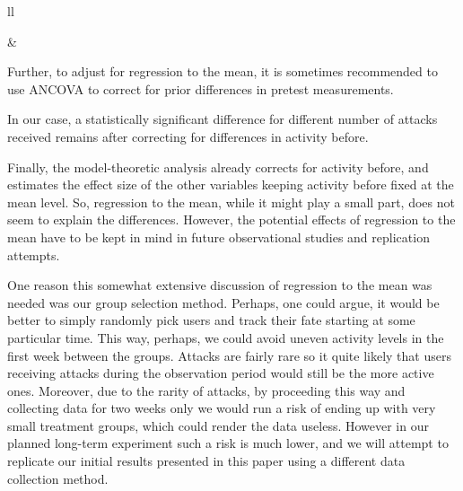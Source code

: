 \documentclass[10pt,dvipsnames]{scrartcl}
\begin{document}
\noindent 

\begin{tabular}{ll}
\begin{minipage}[c]{0.61\linewidth}

\begin{table}[H]
\footnotesize
{}
\normalsize 
\caption{Results of ANCOVA test of activity difference vs. activity before and the number of narrow attacks received.}
\end{table}
\end{minipage} & \begin{minipage}[c]{0.32\linewidth}
Further, to adjust for regression to the mean, it is sometimes recommended to  use ANCOVA to correct for prior differences in pretest measurements. 
\end{minipage}
\end{tabular}

\noindent In our case, a statistically significant difference for
different number of attacks received remains after correcting for
differences in activity before.

Finally, the model-theoretic analysis already corrects for activity
before, and estimates the effect size of the other variables keeping
activity before fixed at the mean level. So, regression to the mean,
while it might play a small part, does not seem to explain the
differences. However, the potential effects of regression to the mean
have to be kept in mind in future observational studies and replication
attempts.

One reason this somewhat extensive discussion of regression to the mean
was needed was our group selection method. Perhaps, one could argue, it
would be better to simply randomly pick users and track their fate
starting at some particular time. This way, perhaps, we could avoid
uneven activity levels in the first week between the groups. Attacks are
fairly rare so it quite likely that users receiving attacks during the
observation period would still be the more active ones. Moreover, due to
the rarity of attacks, by proceeding this way and collecting data for
two weeks only we would run a risk of ending up with very small
treatment groups, which could render the data useless. However in our
planned long-term experiment such a risk is much lower, and we will
attempt to replicate our initial results presented in this paper using a
different data collection method.
\end{document}
